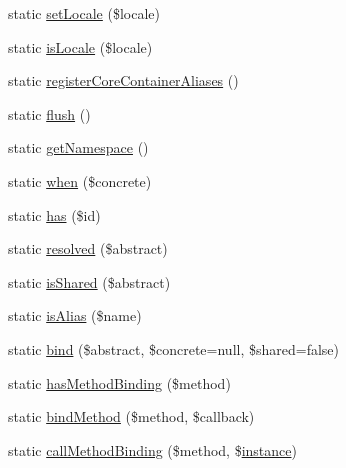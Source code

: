 \begin{DoxyCompactItemize}
\item 
static \mbox{\hyperlink{class_illuminate_1_1_support_1_1_facades_1_1_app_a8086d8d1be8bc33af2730f4a23f8dd7d}{set\+Locale}} (\$locale)
\item 
static \mbox{\hyperlink{class_illuminate_1_1_support_1_1_facades_1_1_app_aaf446792c0b06fd9d8ae04eaf49bd0f3}{is\+Locale}} (\$locale)
\item 
static \mbox{\hyperlink{class_illuminate_1_1_support_1_1_facades_1_1_app_aa40d73f464d8ea9b6773de92627724ba}{register\+Core\+Container\+Aliases}} ()
\item 
static \mbox{\hyperlink{class_illuminate_1_1_support_1_1_facades_1_1_app_a168870a69340a27e4d660cbcf7189558}{flush}} ()
\item 
static \mbox{\hyperlink{class_illuminate_1_1_support_1_1_facades_1_1_app_ab9efc7221fd51924278d9a959348a556}{get\+Namespace}} ()
\item 
static \mbox{\hyperlink{class_illuminate_1_1_support_1_1_facades_1_1_app_a9255963e97fbfb9128c9dd66e60c0d36}{when}} (\$concrete)
\item 
static \mbox{\hyperlink{class_illuminate_1_1_support_1_1_facades_1_1_app_a86f6f04a4b68b1a96c67b8b5cd5e1c39}{has}} (\$id)
\item 
static \mbox{\hyperlink{class_illuminate_1_1_support_1_1_facades_1_1_app_ae7d043eb1da4cdba908ddcacdeb7ad67}{resolved}} (\$abstract)
\item 
static \mbox{\hyperlink{class_illuminate_1_1_support_1_1_facades_1_1_app_a345cc220f504fb29e2345e66f4817a4a}{is\+Shared}} (\$abstract)
\item 
static \mbox{\hyperlink{class_illuminate_1_1_support_1_1_facades_1_1_app_afaf25e56d5c74d2bc97da60866fdc73a}{is\+Alias}} (\$name)
\item 
static \mbox{\hyperlink{class_illuminate_1_1_support_1_1_facades_1_1_app_a3957346546b9adf11c0914ff37367685}{bind}} (\$abstract, \$concrete=null, \$shared=false)
\item 
static \mbox{\hyperlink{class_illuminate_1_1_support_1_1_facades_1_1_app_acd3b7dbd6fff0001ea04ce38b06215c1}{has\+Method\+Binding}} (\$method)
\item 
static \mbox{\hyperlink{class_illuminate_1_1_support_1_1_facades_1_1_app_a5448282fe52aa12e5b1b2d6c6b3172f4}{bind\+Method}} (\$method, \$callback)
\item 
static \mbox{\hyperlink{class_illuminate_1_1_support_1_1_facades_1_1_app_abbf90ce34d22de29e1f0d12e6d11c14f}{call\+Method\+Binding}} (\$method, \$\mbox{\hyperlink{class_illuminate_1_1_support_1_1_facades_1_1_app_aec0719063c5b42f03d9755ca1cddb4a5}{instance}})

\end{DoxyCompactItemize}
